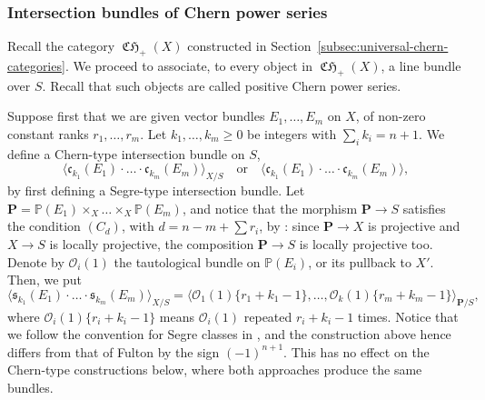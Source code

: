 \documentclass[JEP,XML,SOM,Unicode,published]{cedram}
\theoremstyle{plain}
\theoremstyle{definition}
\newcommand{\Pbold}{\mathbf{P}}
\newcommand{\PBbb}{\mathbb P}
\newcommand{\Ocal}{\mathcal O}
\newcommand{\cfrak}{\mathfrak c}
\newcommand{\sfrak}{\mathfrak s}
\DeclareMathOperator{\CHfrak}{\mathfrak{CH}}
\begin{document}
\subsubsection{Intersection bundles of Chern power series}
Recall the category $\CHfrak_{+}(X)$ constructed in Section~\ref{subsec:universal-chern-categories}. We proceed to associate, to every object in $\CHfrak_{+}(X)$, a line bundle over $S$. Recall that such objects are called positive Chern power series.

Suppose first that we are given vector bundles $E_1, \ldots, E_m$ on $X$, of non-zero constant ranks $r_1, \ldots, r_m$. Let $k_{1},\ldots,k_{m}\geq 0$ be integers with $\sum_{i}k_{i}=n+1$. We define a Chern-type intersection bundle on $S$,
\begin{equation}\label{eq:general-Chern-bundle-1}
\langle \cfrak_{k_{1}}(E_{1})\cdot\ldots \cdot \cfrak_{k_{m}}(E_{m})\rangle_{X/S}\quad\text{or}\quad \langle \cfrak_{k_{1}}(E_{1})\cdot\ldots \cdot \cfrak_{k_{m}}(E_{m})\rangle,
\end{equation}
by first defining a Segre-type intersection bundle. Let $\Pbold=\PBbb(E_{1})\times_{X}\ldots\times_{X}\PBbb(E_{m})$, and notice that the morphism $\Pbold\to S$ satisfies the condition $(C_{d})$, with $d=n-m+\sum r_{i}$, by \cite[\href{https://stacks.math.columbia.edu/tag/0C4P}{0C4P}]{stacks-project}: since $\Pbold\to X$ is projective and $X\to S$ is locally projective, the composition $\Pbold\to S$ is locally projective too. Denote by $\Ocal_i (1)$ the tautological bundle on $\PBbb (E_{i})$, or its pullback to $X'$. Then, we put\vspace*{-3pt}
\begin{equation}\label{eq:definition-Segre-classes}
\langle \sfrak_{k_1}(E_1)\cdot \ldots\cdot \sfrak_{k_{m}}(E_m) \rangle_{X/S} = \langle \Ocal_1 (1)\{r_1+k_1-1\}, \ldots, \Ocal_k (1)\{r_m+k_{m}-1\} \rangle_{\Pbold/S},
\end{equation}
where $\Ocal_i (1)\{r_i+k_i-1\}$ means $\Ocal_{i}(1)$ repeated $r_{i}+k_{i}-1$ times. Notice that we follow the convention for Segre classes in \cite{Elkikfib}, and the construction above hence differs from that of Fulton \cite{Fulton} by the sign $(-1)^{n+1}$. This has no effect on the Chern-type constructions below, where both approaches produce the same bundles.
\end{document}
